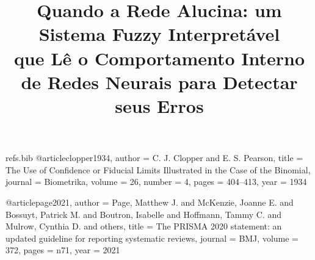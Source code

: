\begin{filecontents*}[overwrite]{refs.bib}
@article{clopper1934,
  author  = {C. J. Clopper and E. S. Pearson},
  title   = {The Use of Confidence or Fiducial Limits Illustrated in the Case of the Binomial},
  journal = {Biometrika},
  volume  = {26},
  number  = {4},
  pages   = {404--413},
  year    = {1934}
}

@article{page2021,
  author  = {Page, Matthew J. and McKenzie, Joanne E. and Bossuyt, Patrick M. and Boutron, Isabelle and Hoffmann, Tammy C. and Mulrow, Cynthia D. and others},
  title   = {The {PRISMA} 2020 statement: an updated guideline for reporting systematic reviews},
  journal = {BMJ},
  volume  = {372},
  pages   = {n71},
  year    = {2021}
}
\end{filecontents*}
\documentclass[conference,a4paper]{IEEEtran}
\IEEEoverridecommandlockouts

\usepackage[utf8]{inputenc}
\usepackage[T1]{fontenc}
\usepackage{cite}
\usepackage{amsmath,amssymb,amsfonts}
\usepackage{graphicx}
\usepackage{booktabs,multirow}
\usepackage{textcomp}
\usepackage{xcolor}
\usepackage{pgfplots}
\pgfplotsset{compat=1.16}
\usepackage[hidelinks]{hyperref}

\newcommand{\todo}[1]{\textcolor{red}{[TODO: #1]}}
\newcommand{\term}[1]{\textsc{#1}}



\title{Quando a Rede Alucina: um Sistema Fuzzy Interpretável\\
que Lê o Comportamento Interno de Redes Neurais para Detectar seus Erros}

\author{}

\maketitle


